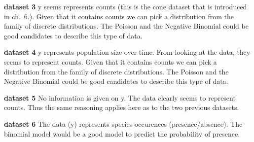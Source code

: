 \documentclass[]{article}
\begin{document}
\begin{enumerate}
  \textbf{dataset 3} y seems represents counts (this is the cone dataset
  that is introduced in ch.~6.). Given that it contains counts we can
  pick a distribution from the family of discrete distributions. The
  Poisson and the Negative Binomial could be good candidates to describe
  this type of data.

  \textbf{dataset 4} y represents population size over time. From
  looking at the data, they seems to represent counts. Given that it
  contains counts we can pick a distribution from the family of discrete
  distributions. The Poisson and the Negative Binomial could be good
  candidates to describe this type of data.

  \textbf{dataset 5} No information is given on y. The data clearly
  seems to represent counts. Thus the same reasoning applies here as to
  the two previous datasets.

  \textbf{dataset 6} The data (y) represents species occurences
  (presence/absence). The binomial model would be a good model to
  predict the probability of presence.
\end{enumerate}
\end{document}
